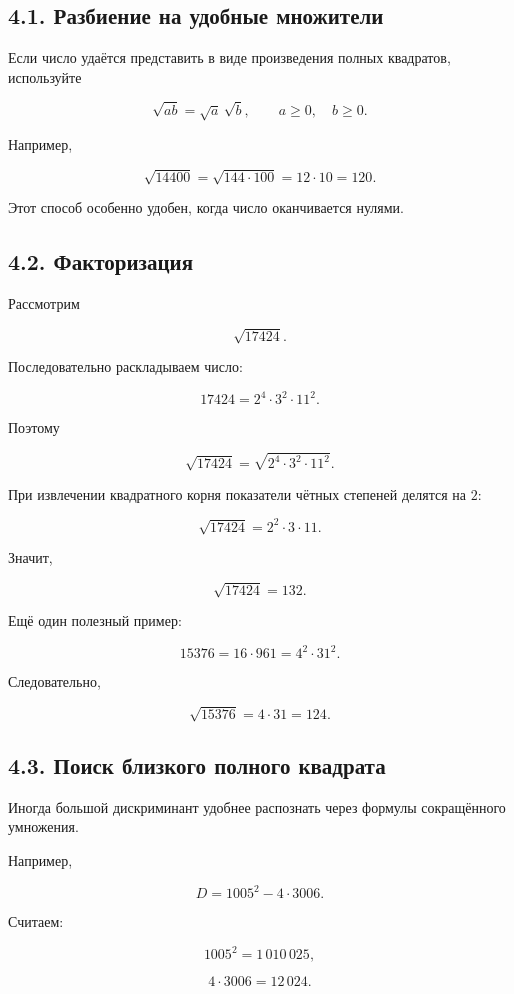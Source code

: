 \documentclass[a4paper,12pt]{article}
\begin{document}
\subsection*{4.1. Разбиение на удобные множители}

Если число удаётся представить
в виде произведения полных квадратов, используйте

\[
\sqrt{ab}
=
\sqrt a\,\sqrt b,
\qquad
a\ge0,\quad b\ge0.
\]

Например,

\[
\sqrt{14400}
=
\sqrt{144\cdot100}
=
12\cdot10
=
120.
\]

Этот способ особенно удобен,
когда число оканчивается нулями.

\subsection*{4.2. Факторизация}

Рассмотрим

\[
\sqrt{17424}.
\]

Последовательно раскладываем число:

\[
17424
=
2^4\cdot3^2\cdot11^2.
\]

Поэтому

\[
\sqrt{17424}
=
\sqrt{2^4\cdot3^2\cdot11^2}.
\]

При извлечении квадратного корня
показатели чётных степеней делятся на \(2\):

\[
\sqrt{17424}
=
2^2\cdot3\cdot11.
\]

Значит,

\[
\boxed{\sqrt{17424}=132}.
\]

Ещё один полезный пример:

\[
15376
=
16\cdot961
=
4^2\cdot31^2.
\]

Следовательно,

\[
\sqrt{15376}
=
4\cdot31
=
124.
\]

\subsection*{4.3. Поиск близкого полного квадрата}

Иногда большой дискриминант удобнее распознать
через формулы сокращённого умножения.

Например,

\[
D
=
1005^2-4\cdot3006.
\]

Считаем:

\[
1005^2=1\,010\,025,
\]

\[
4\cdot3006=12\,024.
\]
\end{document}
